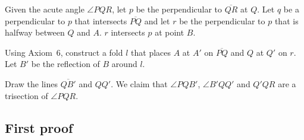 Given the acute angle $\angle PQR$, let $p$ be the perpendicular to $\overline{QR}$ at $Q$. Let $q$ be a perpendicular to $p$ that intersects $\overline{PQ}$ and let $r$ be the perpendicular to $p$ that is halfway between $Q$ and $A$. $r$ intersects $p$ at point $B$.

Using Axiom~6, construct a fold $l$ that places $A$ at $A'$ on $\overline{PQ}$ and $Q$ at $Q'$ on $r$. Let $B'$ be the reflection of $B$ around $l$.

Draw the lines $\overline{QB'}$ and $QQ'$. We claim that $\angle PQB'$, $\angle B'QQ'$ and $Q'QR$ are a trisection of $\angle PQR$.

\subsection{First proof}

